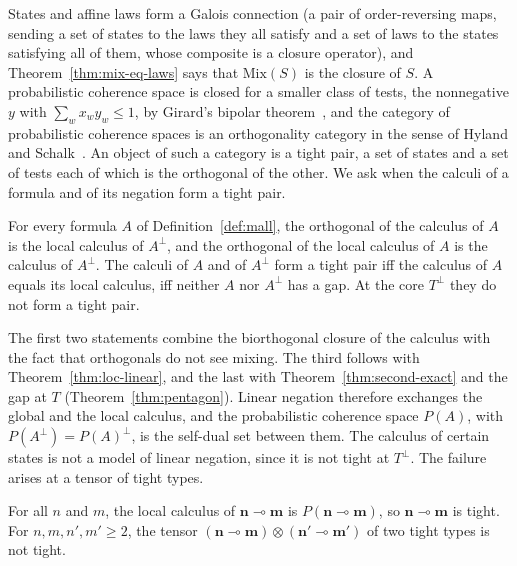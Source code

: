 States and affine laws form a Galois connection (a pair of
order-reversing maps, sending a set of states to the laws they all
satisfy and a set of laws to the states satisfying all of them, whose
composite is a closure operator), and Theorem~\ref{thm:mix-eq-laws} says
that $\mathrm{Mix}(S)$ is the closure of $S$. A probabilistic coherence space is closed for a smaller class of
tests, the nonnegative $y$ with $\sum_w x_w y_w \le 1$, by Girard's
bipolar theorem~\cite{girard2004}, and the category of probabilistic
coherence spaces is an orthogonality category in the sense of Hyland and
Schalk~\cite{hyland-schalk2003,fiore-galal-jafarrahmani2023,tsukada-asada2022}.
An object of such a category is a tight pair, a set of states and a set
of tests each of which is the orthogonal of the other. We ask when the
calculi of a formula and of its negation form a tight pair.

\begin{theorem}
\label{thm:cat-duality}
For every formula $A$ of Definition~\ref{def:mall}, the orthogonal of
the calculus of $A$ is the local calculus of $A^{\perp}$, and the
orthogonal of the local calculus of $A$ is the calculus of $A^{\perp}$.
The calculi of $A$ and of $A^{\perp}$ form a tight pair iff the calculus
of $A$ equals its local calculus, iff neither $A$ nor $A^{\perp}$ has a
gap. At the core $T^{\perp}$ they do not form a tight pair.
\end{theorem}

\noindent
The first two statements combine the biorthogonal closure of the
calculus with the fact that orthogonals do not see mixing. The third
follows with Theorem~\ref{thm:loc-linear}, and the last with
Theorem~\ref{thm:second-exact} and the gap at $T$
(Theorem~\ref{thm:pentagon}). Linear negation therefore exchanges the
global and the local calculus, and the probabilistic coherence space
$P(A)$, with $P(A^{\perp}) = P(A)^{\perp}$, is the self-dual set between
them. The calculus of certain states is not a model of linear negation,
since it is not tight at $T^{\perp}$. The failure arises at a tensor of
tight types.

\begin{corollary}
\label{cor:cat-tensor}
For all $n$ and $m$, the local calculus of $\mathbf{n} \multimap
\mathbf{m}$ is $P(\mathbf{n} \multimap \mathbf{m})$, so
$\mathbf{n} \multimap \mathbf{m}$ is tight. For
$n, m, n', m' \ge 2$, the tensor $(\mathbf{n} \multimap \mathbf{m})
\otimes (\mathbf{n'} \multimap \mathbf{m'})$ of two tight types is not
tight.
\end{corollary}

